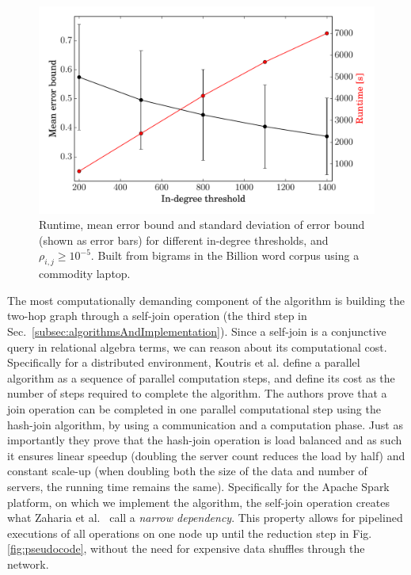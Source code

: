 \documentclass[conference]{IEEEtran}
\newcommand{\rn}[1]{\rho_{#1}}
\begin{document}
\begin{figure}
\begin{centering}
\includegraphics[width=1.0\columnwidth]{figures/billion-e-rt-2.pdf}
\end{centering}
\caption{Runtime, mean error bound and standard deviation of error bound (shown as error bars) for different in-degree 
thresholds, and $\rn{i,j} \geq 10^{-5}$. Built from bigrams in the Billion word corpus using a commodity laptop.}
\label{fig:billion-e-runtime}
\end{figure}

The most computationally demanding component of the algorithm is
building the two-hop graph through a self-join operation (the third step in Sec.\ \ref{subsec:algorithmsAndImplementation}).
Since a self-join is a conjunctive query \cite{Chandra77} in relational algebra terms,
we can reason about its computational cost.
Specifically for a distributed environment, Koutris et al. \cite{koutris2011conjuctive}
define a parallel algorithm as a sequence of parallel computation steps, and define its
cost as the number of steps required to complete the algorithm.
The authors prove that a join operation can be completed in one parallel computational
step using the hash-join algorithm, by using a communication and a computation phase.
Just as importantly they prove that the hash-join operation is load balanced
and as such it ensures linear speedup (doubling the server count reduces the load by
half) and constant scale-up (when doubling both the size of the data and number of servers, the running time remains the same).
Specifically for the Apache Spark platform, on which we implement the algorithm,
the self-join operation creates what Zaharia et al.\ \cite{Zaharia-2012}
call a \textit{narrow dependency}. This property allows for pipelined executions
of all operations on one node up until the reduction step in Fig. \ref{fig:pseudocode}, without the need for expensive data shuffles
through the network.
\end{document}
